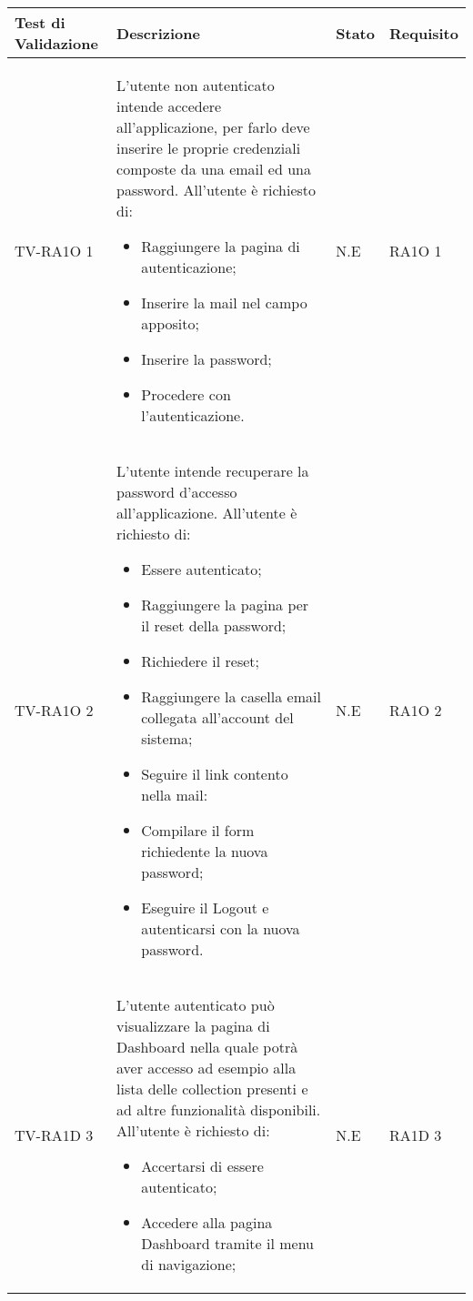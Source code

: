 
	\begin{center}
	\def\arraystretch{1.5}
	\bgroup
		\begin{longtable}{| p{3cm} | p{6cm} | p{1.5cm} | p{2cm} | }
		\hline 
		 \textbf{Test di Validazione} & \textbf{Descrizione} & \textbf{Stato} & \textbf{Requisito} \\ \hline
				TV-RA1O 1 & 
				L'utente non autenticato intende accedere all'applicazione, per farlo deve inserire le proprie credenziali composte da una email ed una password.
All'utente è richiesto di:
\begin{itemize}
\item Raggiungere la pagina di autenticazione;
\item Inserire la mail nel campo apposito;
\item Inserire la password;
\item Procedere con l'autenticazione.
\end{itemize}
 & N.E & RA1O 1\newline  \\ \hline 
				TV-RA1O 2 & 
				L'utente intende recuperare la password d'accesso all'applicazione.
All'utente è richiesto di:
\begin{itemize}
\item Essere autenticato;
\item Raggiungere la pagina per il reset della password;
\item Richiedere il reset;
\item Raggiungere la casella email collegata all'account del sistema;
\item Seguire il link contento nella mail:
\item Compilare il form richiedente la nuova password;
\item Eseguire il Logout e autenticarsi con la nuova password.
\end{itemize} & N.E & RA1O 2\newline  \\ \hline 
				TV-RA1D 3 & 
				L'utente autenticato può visualizzare la pagina di Dashboard nella quale potrà aver accesso ad esempio alla lista delle collection presenti e ad altre funzionalità disponibili.
All'utente è richiesto di:
\begin{itemize}
\item Accertarsi di essere autenticato;
\item Accedere alla pagina Dashboard tramite il menu di navigazione;
\end{itemize} & N.E & RA1D 3\newline  \\ \hline 

\end{longtable}
\end{center}
